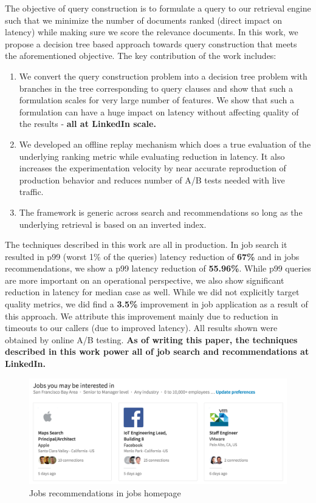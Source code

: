 The objective of query construction is to formulate a query to our retrieval
engine such that we minimize the number of documents ranked (direct impact on
latency) while making sure we score the relevance documents. In this work, we
propose a decision tree based approach towards query construction that meets the
aforementioned objective. The key contribution of the work includes: 
\begin{enumerate}
        \item We convert the query construction problem into a decision tree
            problem with branches in the tree corresponding to query clauses 
            and show that such a formulation scales for very large number of features. 
            We show that such a formulation can have a huge impact on latency
            without affecting quality of the results - {\bf all at LinkedIn scale.}
        \item We developed an offline replay mechanism which does a true
            evaluation of the underlying ranking metric while evaluating reduction
            in latency. It also increases the experimentation velocity by near
            accurate reproduction of production behavior and reduces number of
            A/B tests needed with live traffic. 
        \item The framework is generic across search and recommendations so
            long as the underlying retrieval is based on an inverted index.
\end{enumerate}
The techniques described in this work are all in production. In job search it
resulted in p99 (worst 1\% of the queries) latency reduction of {\bf 67\%} 
and in jobs recommendations, we show a p99 latency reduction of {\bf 55.96\%}. While
p99 queries are more important on an operational perspective, we also show
significant reduction in latency for median case as well. While we did not
explicitly target quality metrics, we did find a {\bf 3.5\%} improvement in job
application as a result of this approach. We attribute this improvement mainly
due to reduction in timeouts to our callers (due to improved latency). All
results shown were obtained by online A/B testing. {\bf As of writing this paper, 
the techniques described in this work power all of job search and
recommendations at LinkedIn.}


\begin{figure}
\includegraphics[width=\linewidth,height=\textheight,keepaspectratio]{jymbii.png}
\caption{Jobs recommendations in jobs homepage}
\label{fig:jymbii-jobs-home}
\end{figure}

